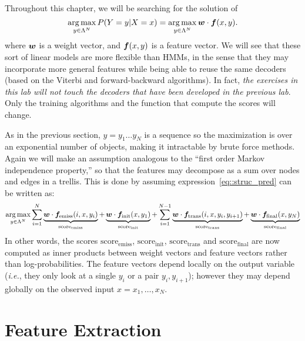 Throughout this chapter, we will be searching for the solution of 
\begin{equation}
\operatorname*{arg\,max}_{y \in \Lambda^N} P(Y=y | X=x) = \operatorname*{arg\,max}_{y \in \Lambda^N} \boldsymbol{w} \cdot  \boldsymbol{f}(x,y). \label{eq::struc_pred} 
\end{equation}
where $\boldsymbol{w}$ is a weight vector, and $\boldsymbol{f}(x,y)$ is a feature vector. We will see that these sort of linear models are more flexible than HMMs, in the sense that they may incorporate 
more general features while being able to reuse the same decoders (based on the Viterbi and forward-backward algorithms). In fact, \emph{the exercises in this lab will not touch the decoders that 
have been developed in the previous lab}. Only the training algorithms and the function that 
compute the scores will change.

As in the previous section, $y = y_1\ldots y_N$ is a sequence so the maximization
is over an exponential number of objects, making it intractable by brute force methods. Again
we will make an assumption analogous to the ``first order Markov independence property,'' so that the
features may decompose as a sum over nodes and edges in a trellis. 
This is done by assuming expression~\ref{eq::struc_pred} can be written as:
\begin{equation}
\operatorname*{arg\,max}_{y \in \Lambda^N} 
\sum_{i=1}^N \underbrace{\boldsymbol{w} \cdot \boldsymbol{f}_{\mathrm{emiss}}(i,x,y_i)}_{\mathrm{score}_{\mathrm{emiss}}}  + 
\underbrace{\boldsymbol{w} \cdot \boldsymbol{f}_{\mathrm{init}}(x,y_1)}_{\mathrm{score}_{\mathrm{init}}}  + 
\sum_{i=1}^{N-1} \underbrace{\boldsymbol{w} \cdot \boldsymbol{f}_{\mathrm{trans}}(i,x,y_i,y_{i+1})}_{\mathrm{score}_{\mathrm{trans}}}+ 
\underbrace{\boldsymbol{w} \cdot \boldsymbol{f}_{\mathrm{final}}(x,y_N)}_{\mathrm{score}_{\mathrm{final}}}
\label{eq::struc_pred_decompose}
\end{equation}
In other words, the scores ${\mathrm{score}_{\mathrm{emiss}}}$, 
${\mathrm{score}_{\mathrm{init}}}$, ${\mathrm{score}_{\mathrm{trans}}}$
and ${\mathrm{score}_{\mathrm{final}}}$ are now computed as inner products 
between weight vectors and feature vectors rather than log-probabilities.
The feature vectors depend locally on the output variable 
(\emph{i.e.}, they only look at a single $y_i$ or a pair $y_i,y_{i+1}$);
however they may depend globally on the observed input $x=x_{1},\ldots,x_{N}$.

\section{\label{seq::features} Feature Extraction}

